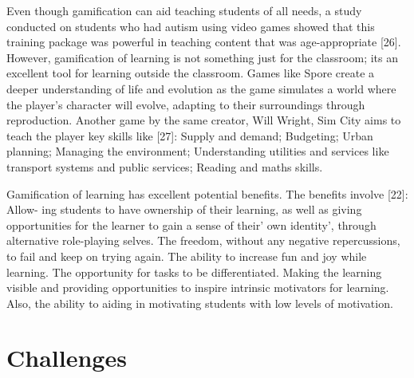 \documentclass{sigchi}
\begin{document}
Even though gamification can aid teaching students of all needs, a study conducted on students who had autism using video games showed that this training package was powerful in teaching content that was age-appropriate [26]. However, gamification of learning is not something just for the classroom; its an excellent tool for learning outside the classroom. Games like Spore create a deeper understanding of life and evolution as the game simulates a world where the player’s character will evolve, adapting to their surroundings through reproduction. Another game by the same creator, Will Wright, Sim City aims to teach the player key skills like [27]: Supply and demand; Budgeting; Urban planning; Managing the environment; Understanding utilities and services like transport systems and public services; Reading and maths skills. 

Gamification of learning has excellent potential benefits. The benefits involve [22]: Allow- ing students to have ownership of their learning, as well as giving opportunities for the learner to gain a sense of their’ own identity’, through alternative role-playing selves. The freedom, without any negative repercussions, to fail and keep on trying again. The ability to increase fun and joy while learning. The opportunity for tasks to be differentiated. Making the learning visible and providing opportunities to inspire intrinsic motivators for learning. Also, the ability to aiding in motivating students with low levels of motivation. 


\section{Challenges}
\end{document}
